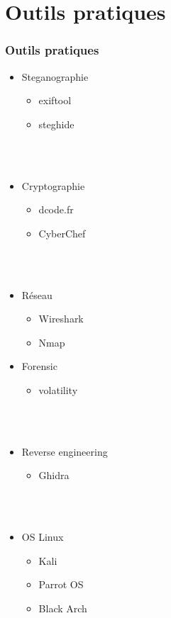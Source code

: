 \documentclass{beamer}
\begin{document}
\section{Outils pratiques}

\begin{frame}
\frametitle{Outils pratiques}

\begin{multicols}{2}
\begin{itemize}
    \item Steganographie
    \begin{itemize}
        \item exiftool
        \item steghide
    \end{itemize}
    \\~\\
    \item Cryptographie
    \begin{itemize}
        \item dcode.fr
        \item CyberChef
    \end{itemize}
    \\~\\
    \item Réseau
    \begin{itemize}
        \item Wireshark
        \item Nmap
    \end{itemize}
    
    \item Forensic
    \begin{itemize}
        \item volatility
    \end{itemize}
    \\~\\
    \item Reverse engineering
    \begin{itemize}
        \item Ghidra
    \end{itemize}
    \\~\\
    \item OS Linux
    \begin{itemize}
        \item Kali
        \item Parrot OS
        \item Black Arch
    \end{itemize}

\end{itemize}
\end{multicols}

\end{frame}
\end{document}
